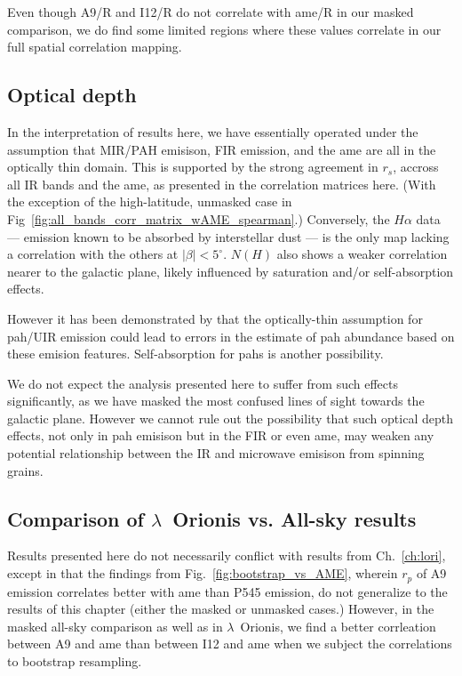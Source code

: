              Even though A9/R and I12/R do not correlate with \gls{ame}/R in our masked comparison, we do find some limited regions where these values correlate in our full spatial correlation mapping.

            \subsection{Optical depth}
              In the interpretation of results here, we have essentially operated under the assumption that MIR/PAH emisison, FIR emission, and the \gls{ame} are all in the optically thin domain. This is supported by the strong agreement in $r_{s}$, accross all IR bands and the \gls{ame}, as presented in the correlation matrices here. (With the exception of the high-latitude, unmasked case in Fig~\ref{fig:all_bands_corr_matrix_wAME_spearman}.) Conversely, the $H{\alpha}$ data --- emission known to be absorbed by interstellar dust --- is the only map lacking a correlation with the others at $|\beta{}|<5^{\circ}$. $N(H)$ also shows a weaker correlation nearer to the galactic plane, likely influenced by saturation and/or self-absorption effects.

              However it has been demonstrated by \cite{sakon04} that the optically-thin assumption for \gls{pah}/UIR emission could lead to errors in the estimate of \gls{pah} abundance based on these emision features. Self-absorption for \gls{pah}s is another possibility.

              We do not expect the analysis presented here to suffer from such effects significantly, as we have masked the most confused lines of sight towards the galactic plane. However we cannot rule out the possibility that such optical depth effects, not only in \gls{pah} emisison but in the FIR or even \gls{ame}, may weaken any potential relationship between the IR and microwave emisison from spinning grains.

            \subsection{Comparison of $\lambda$~Orionis vs. All-sky results}
              Results presented here do not necessarily conflict with results from Ch.~\ref{ch:lori}, except in that the findings from Fig.~\ref{fig:bootstrap_vs_AME}, wherein $r_{p}$ of A9 emission correlates better with \gls{ame} than P545 emission, do not generalize to the results of this chapter (either the masked or unmasked cases.) However, in the masked all-sky comparison as well as in $\lambda$~Orionis, we find a better corrleation between A9 and \gls{ame} than between I12 and \gls{ame} when we subject the correlations to bootstrap resampling.

